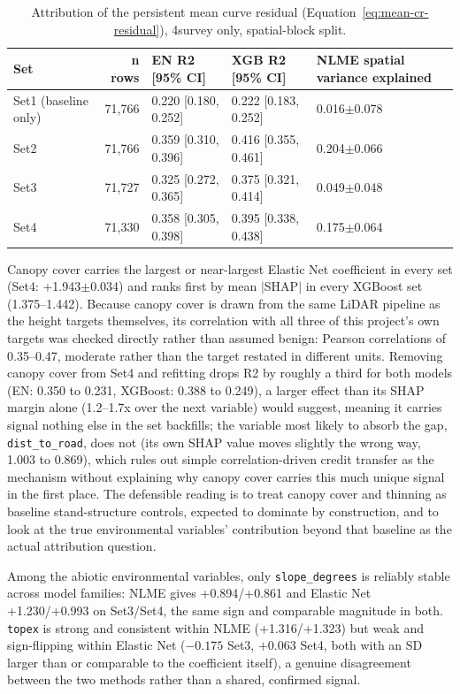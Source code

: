 \documentclass[11pt,a4paper]{report}
\begin{document}
\begin{table}[!htbp]
\centering
\scriptsize
\renewcommand{\arraystretch}{1.2}
\begin{tabular}{lrlll}
\toprule
Set & n rows & EN R2 [95\% CI] & XGB R2 [95\% CI] & NLME spatial variance explained \\
\midrule
Set1 (baseline only) & 71{,}766 & 0.220 [0.180, 0.252] & 0.222 [0.183, 0.252] & 0.016$\pm$0.078 \\
Set2 & 71{,}766 & 0.359 [0.310, 0.396] & 0.416 [0.355, 0.461] & 0.204$\pm$0.066 \\
Set3 & 71{,}727 & 0.325 [0.272, 0.365] & 0.375 [0.321, 0.414] & 0.049$\pm$0.048 \\
Set4 & 71{,}330 & 0.358 [0.305, 0.398] & 0.395 [0.338, 0.438] & 0.175$\pm$0.064 \\
\bottomrule
\end{tabular}
\caption{Attribution of the persistent mean curve residual (Equation~\ref{eq:mean-cr-residual}),
4survey only, spatial-block split.}
\label{tab:results-rq2b}
\end{table}

Canopy cover carries the largest or near-largest Elastic Net coefficient in every set
(Set4: +1.943$\pm$0.034) and ranks first by mean $|$SHAP$|$ in every XGBoost set
(1.375--1.442). Because canopy cover is drawn from the same LiDAR pipeline as the
height targets themselves, its correlation with all three of this project's own
targets was checked directly rather than assumed benign: Pearson correlations of
0.35--0.47, moderate rather than the target restated in different units. Removing
canopy cover from Set4 and refitting drops R2 by roughly a third for both models (EN:
0.350 to 0.231, XGBoost: 0.388 to 0.249), a larger effect than its SHAP margin alone
(1.2--1.7x over the next variable) would suggest, meaning it carries signal nothing
else in the set backfills; the variable most likely to absorb the gap,
\texttt{dist\_to\_road}, does not (its own SHAP value moves slightly the wrong way,
1.003 to 0.869), which rules out simple correlation-driven credit transfer as the
mechanism without explaining why canopy cover carries this much unique signal in the
first place. The defensible reading is to treat canopy cover and thinning as baseline
stand-structure controls, expected to dominate by construction, and to look at the
true environmental variables' contribution beyond that baseline as the actual
attribution question.

Among the abiotic environmental variables, only \texttt{slope\_degrees} is reliably
stable across model families: NLME gives +0.894/+0.861 and Elastic Net +1.230/+0.993
on Set3/Set4, the same sign and comparable magnitude in both. \texttt{topex} is
strong and consistent within NLME (+1.316/+1.323) but weak and sign-flipping within
Elastic Net ($-0.175$ Set3, $+0.063$ Set4, both with an SD larger than or comparable
to the coefficient itself), a genuine disagreement between the two methods rather than
a shared, confirmed signal.
\end{document}

